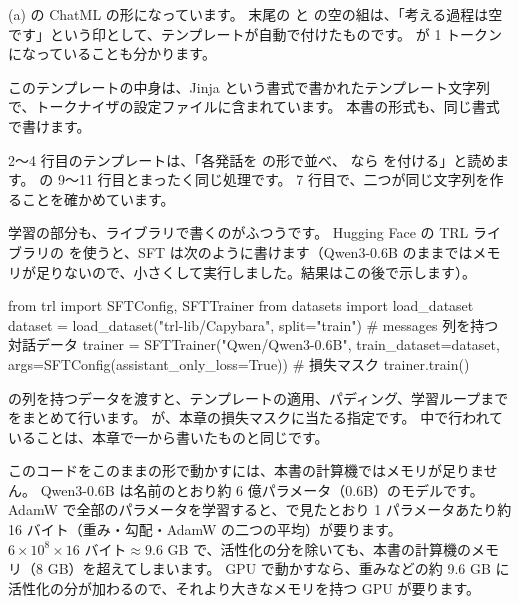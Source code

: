 
(a) の ChatML の形になっています。
末尾の  と  の空の組は、「考える過程は空です」という印として、テンプレートが自動で付けたものです。
 が 1 トークンになっていることも分かります。

このテンプレートの中身は、Jinja という書式で書かれたテンプレート文字列で、トークナイザの設定ファイルに含まれています。
本書の形式も、同じ書式で書けます。


2〜4 行目のテンプレートは、「各発話を  の形で並べ、 なら  を付ける」と読めます。
 の 9〜11 行目とまったく同じ処理です。
7 行目で、二つが同じ文字列を作ることを確かめています。

学習の部分も、ライブラリで書くのがふつうです。
Hugging Face の TRL ライブラリの  を使うと、SFT は次のように書けます（Qwen3-0.6B のままではメモリが足りないので、小さくして実行しました。結果はこの後で示します）。

\begin{pycode}
from trl import SFTConfig, SFTTrainer
from datasets import load_dataset
dataset = load_dataset("trl-lib/Capybara", split="train")  # messages 列を持つ対話データ
trainer = SFTTrainer("Qwen/Qwen3-0.6B", train_dataset=dataset,
                     args=SFTConfig(assistant_only_loss=True))  # 損失マスク
trainer.train()
\end{pycode}

 の列を持つデータを渡すと、テンプレートの適用、パディング、学習ループまでをまとめて行います。
 が、本章の損失マスクに当たる指定です。
中で行われていることは、本章で一から書いたものと同じです。

このコードをこのままの形で動かすには、本書の計算機ではメモリが足りません。
Qwen3-0.6B は名前のとおり約 6 億パラメータ（0.6B）のモデルです。
AdamW で全部のパラメータを学習すると、で見たとおり 1 パラメータあたり約 16 バイト（重み・勾配・AdamW の二つの平均）が要ります。
$6\times10^{8} \times 16 \text{ バイト} \approx 9.6$ GB で、活性化の分を除いても、本書の計算機のメモリ（8 GB）を超えてしまいます。
GPU で動かすなら、重みなどの約 9.6 GB に活性化の分が加わるので、それより大きなメモリを持つ GPU が要ります。

